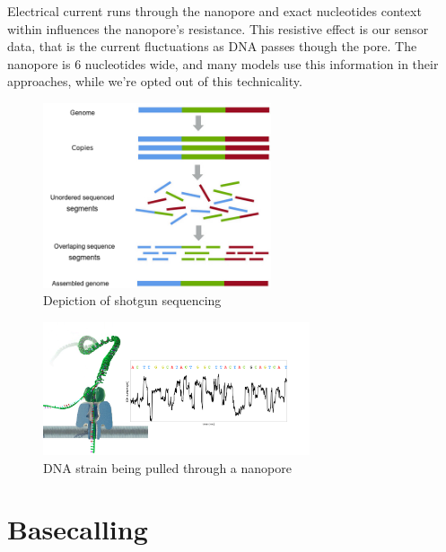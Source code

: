 \documentclass[runningheads,a4paper]{llncs}
\begin{document}
Electrical current runs through the nanopore and exact nucleotides context within influences the nanopore's resistance. This resistive effect is our sensor data, that is the current fluctuations as DNA passes though the pore. The nanopore is 6 nucleotides wide, and many models use this information in their approaches, while we're opted out of this technicality.

\begin{figure}[!ht]
	\begin{center}
		\includegraphics[width=0.6\textwidth]{./imgs/sequencing.png}
		\caption{Depiction of shotgun sequencing}
		\label{fg:sequencing}
	\end{center}
\end{figure}


\begin{figure}[!ht]
	\begin{center}
		\includegraphics[width=0.7\textwidth]{./imgs/nanopore.png}
		\caption[DNA strain being pulled through a nanopore]{DNA strain being pulled through a nanopore \protect\footnotemark}
		\label{fg:nanopore}
	\end{center}
\end{figure}

\section{Basecalling}
\end{document}
